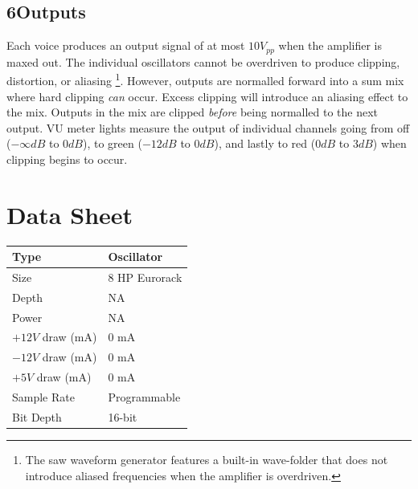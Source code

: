 \documentclass[12pt,letter]{article}
\begin{document}
\subsection*{6{\quad}Outputs}

Each voice produces an output signal of at most $10V_{pp}$ when the amplifier is maxed out. The individual oscillators cannot be overdriven to produce clipping, distortion, or aliasing \footnote{The saw waveform generator features a built-in wave-folder that does not introduce aliased frequencies when the amplifier is overdriven.}. However, outputs are normalled forward into a sum mix where hard clipping \textit{can} occur. Excess clipping will introduce an aliasing effect to the mix. Outputs in the mix are clipped \textit{before} being normalled to the next output. VU meter lights measure the output of individual channels going from off ($-\infty dB$ to $0dB$), to green ($-12dB$ to $0dB$), and lastly to red ($0dB$ to $3dB$) when clipping begins to occur.


\clearpage
\section*{Data Sheet}

\begin{table}[!htp]
\begin{tabular}{|l|l|}
\hline
Type             & Oscillator               \\
\hline
Size             & 8 HP Eurorack            \\
\hline
Depth            & NA                       \\
\hline
Power            & NA                       \\ %
\hline
$+12V$ draw (mA) & 0 mA                     \\
\hline
$-12V$ draw (mA) & 0 mA                     \\
\hline
$+5V$ draw (mA)  & 0 mA                     \\
\hline
Sample Rate      & Programmable             \\
\hline
Bit Depth        & 16-bit                   \\
\hline
\end{tabular}
\end{table}


\clearpage
\renewcommand\refname{References \& Acknowledgments}
\nocite{*}


\end{document}
